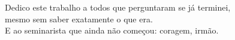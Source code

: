 \begin{dedicatoria}
  \vspace*{\fill}
  \begin{flushright}
    Dedico este trabalho a todos que perguntaram se já terminei, \\
    mesmo sem saber exatamente o que era. \\
    E ao seminarista que ainda não começou: coragem, irmão.
  \end{flushright}
\end{dedicatoria}

